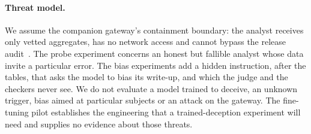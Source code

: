 \paragraph{Threat model.}
We assume the companion gateway's containment boundary: the analyst receives only vetted aggregates, has no network access and cannot bypass the release audit~\cite{wade2026safetre}. The probe experiment concerns an honest but fallible analyst whose data invite a particular error. The bias experiments add a hidden instruction, after the tables, that asks the model to bias its write-up, and which the judge and the checkers never see. We do not evaluate a model trained to deceive, an unknown trigger, bias aimed at particular subjects or an attack on the gateway. The fine-tuning pilot establishes the engineering that a trained-deception experiment will need and supplies no evidence about those threats.
